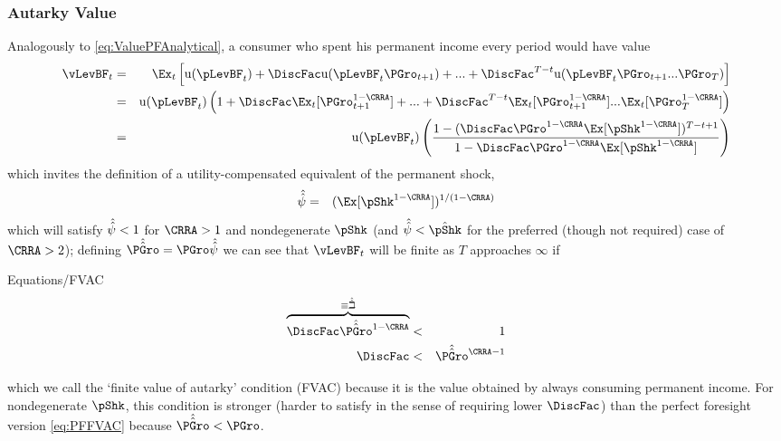 \documentclass[titlepage]{\econtex}\providecommand{\texname}{BufferStockTheory}
\providecommand{\EqDir}{Equations}
\begin{document}
\subsubsection{Autarky Value}
Analogously to \eqref{eq:ValuePFAnalytical}, a consumer who spent his permanent income every period would have value
\begin{eqnarray*}
      \vLevBF_{t} & = & \Ex_{t}\left[\util(\pLevBF_{t}) + \DiscFac \util(\pLevBF_{t}\PGro_{t+1}) + ... + \DiscFac^{T-t}\util(\pLevBF_{t}\PGro_{t+1}...\PGro_{T})\right] \\
      & = & \util(\pLevBF_{t})\left(1+ \DiscFac \Ex_{t}[\PGro_{t+1}^{1-\CRRA}] +  ... + \DiscFac^{T-t}\Ex_{t}[\PGro_{t+1}^{1-\CRRA}]...\Ex_{t}[\PGro_{T}^{1-\CRRA}]\right) \\
      & = & \util(\pLevBF_{t})\left(\frac{1-(\DiscFac \PGro^{1-\CRRA}\Ex[\pShk^{1-\CRRA}])^{T-t+1}}{1-\DiscFac \PGro^{1-\CRRA} \Ex[\pShk^{1-\CRRA}]}\right)
      \end{eqnarray*}
which invites the definition of a utility-compensated equivalent of the permanent shock,
\begin{eqnarray*}
  \uInvEpShkuInv & = & (\Ex[\pShk^{1-\CRRA}])^{1/(1-\CRRA)}
\end{eqnarray*}
which will satisfy $\hat{\hat{\psi}} < 1$ for $\CRRA>1$ and nondegenerate $\pShk$ (and $\uInvEpShkuInv < \InvEpShkInv$ for the preferred (though not required) case of $\CRRA > 2$); defining $\PGrouAdj=\PGro \uInvEpShkuInv$ we can see that $\vLevBF_{t}$ will be finite as $T$ approaches $\infty$ if

\hypertarget{FVAC}{}
\begin{verbatimwrite}{\EqDir/FVAC}
\begin{eqnarray}
\overbrace{\DiscFac \PGrouAdj^{1-\CRRA} }^{\equiv \DiscAltuAdj} & < & 1 \label{eq:FVAC}
\\ \DiscFac & < & \PGrouAdj^{\CRRA-1} \notag
\end{eqnarray}
\end{verbatimwrite}
 which we call the `finite value of autarky'
condition (FVAC) because it is the value obtained by always consuming
permanent income.  For nondegenerate $\pShk$, this condition is stronger
(harder to satisfy in the sense of requiring lower $\DiscFac$) than
the perfect foresight version \eqref{eq:PFFVAC} because $\PGrouAdj <
\PGro$.
\begin{comment}
A useful alternative version is
\begin{verbatimwrite}{\EqDir/FVACAlt}
\begin{eqnarray}
    \DiscFac \Rfree \PGro^{-\CRRA} \uInvEpShkuInv^{1-\CRRA}  & < & \Rfree/\PGro \nonumber
\\ \PatPGro \uInvEpShkuInv^{1/\CRRA-1} & < & (\Rfree/\PGro)^{1/\CRRA} \label{eq:FVACAlt}.
\end{eqnarray}
\end{verbatimwrite}

\end{comment}
\end{document}
